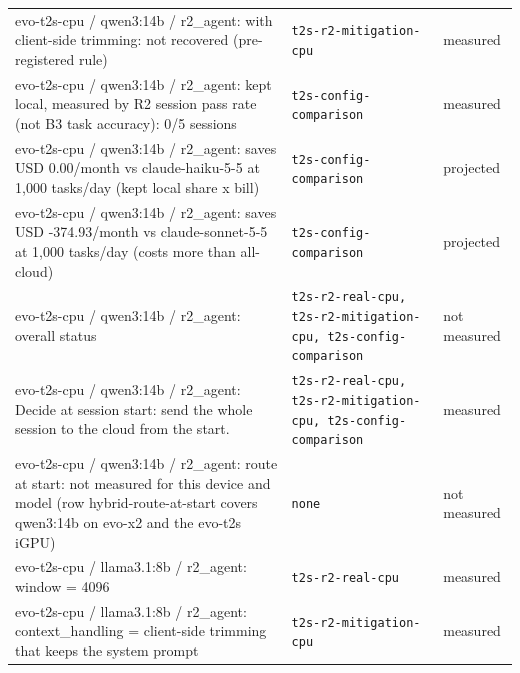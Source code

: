 \begin{longtable}{>{\raggedright\arraybackslash}p{}>{\raggedright\arraybackslash}p{}>{\raggedright\arraybackslash}p{}}
\small evo-t2s-cpu / qwen3:14b / r2\_agent: with client-side trimming: not recovered (pre-registered rule) & {\footnotesize \texttt{t2s-\allowbreak{}r2-\allowbreak{}mitigation-\allowbreak{}cpu}} & \small measured \\

\small evo-t2s-cpu / qwen3:14b / r2\_agent: kept local, measured by R2 session pass rate (not B3 task accuracy): 0/5 sessions & {\footnotesize \texttt{t2s-\allowbreak{}config-\allowbreak{}comparison}} & \small measured \\

\small evo-t2s-cpu / qwen3:14b / r2\_agent: saves USD 0.00/month vs claude-haiku-5-5 at 1,000 tasks/day (kept local share x bill) & {\footnotesize \texttt{t2s-\allowbreak{}config-\allowbreak{}comparison}} & \small projected \\

\small evo-t2s-cpu / qwen3:14b / r2\_agent: saves USD -374.93/month vs claude-sonnet-5-5 at 1,000 tasks/day (costs more than all-cloud) & {\footnotesize \texttt{t2s-\allowbreak{}config-\allowbreak{}comparison}} & \small projected \\

\small evo-t2s-cpu / qwen3:14b / r2\_agent: overall status & {\footnotesize \texttt{t2s-\allowbreak{}r2-\allowbreak{}real-\allowbreak{}cpu, t2s-\allowbreak{}r2-\allowbreak{}mitigation-\allowbreak{}cpu, t2s-\allowbreak{}config-\allowbreak{}comparison}} & \small not measured \\

\small evo-t2s-cpu / qwen3:14b / r2\_agent: Decide at session start: send the whole session to the cloud from the start. & {\footnotesize \texttt{t2s-\allowbreak{}r2-\allowbreak{}real-\allowbreak{}cpu, t2s-\allowbreak{}r2-\allowbreak{}mitigation-\allowbreak{}cpu, t2s-\allowbreak{}config-\allowbreak{}comparison}} & \small measured \\

\small evo-t2s-cpu / qwen3:14b / r2\_agent: route at start: not measured for this device and model (row hybrid-route-at-start covers qwen3:14b on evo-x2 and the evo-t2s iGPU) & {\footnotesize \texttt{none}} & \small not measured \\

\small evo-t2s-cpu / llama3.1:8b / r2\_agent: window = 4096 & {\footnotesize \texttt{t2s-\allowbreak{}r2-\allowbreak{}real-\allowbreak{}cpu}} & \small measured \\

\small evo-t2s-cpu / llama3.1:8b / r2\_agent: context\_handling = client-side trimming that keeps the system prompt & {\footnotesize \texttt{t2s-\allowbreak{}r2-\allowbreak{}mitigation-\allowbreak{}cpu}} & \small measured \\


\end{longtable}
